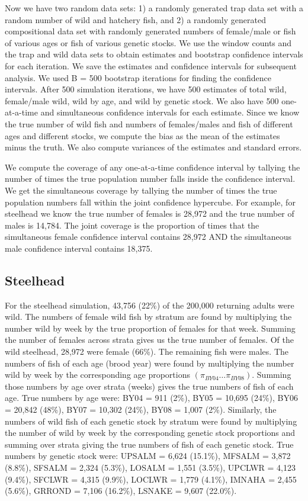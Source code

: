 \documentclass[12pt]{article}
\begin{document}
Now we have two random data sets: 1) a randomly generated trap data set with a random number of wild and hatchery fish, and 2) a randomly generated compositional data set with randomly generated numbers of female/male or fish of various ages or fish of various genetic stocks. We use the window counts and the trap and wild data sets to obtain estimates and bootstrap confidence intervals for each iteration. We save the estimates and confidence intervals for subsequent analysis. We used B = 500 bootstrap iterations for finding the confidence intervals. After 500 simulation iterations, we have 500 estimates of total wild, female/male wild, wild by age, and wild by genetic stock. We also have 500 one-at-a-time and simultaneous confidence intervals for each estimate. Since we know the true number of wild fish and numbers of females/males and fish of different ages and different stocks, we compute the bias as the mean of the estimates minus the truth. We also compute variances of the estimates and standard errors.

We compute the coverage of any one-at-a-time confidence interval by tallying the number of times the true population number falls inside the confidence interval. We get the simultaneous coverage by tallying the number of times the true population numbers fall within the joint confidence hypercube. For example, for steelhead we know the true number of females is 28,972 and the true number of males is 14,784. The joint coverage is the proportion of times that the simultaneous female confidence interval contains 28,972 AND the simultaneous male confidence interval contains 18,375.

\subsection{Steelhead}

For the steelhead simulation, 43,756 (22\%) of the 200,000 returning adults were wild. The numbers of female wild fish by stratum are found by multiplying the number wild by week by the true proportion of females for that week. Summing the number of females across strata gives us the true number of females. Of the wild steelhead, 28,972 were female (66\%). The remaining fish were males. The numbers of fish of each age (brood year) were found by multiplying the number wild by week by the corresponding age proportions $(\pi_{BY04}\ldots \pi_{BY08})$. Summing those numbers by age over strata (weeks) gives the true numbers of fish of each age. True numbers by age were: BY04 = 911 (2\%), BY05 = 10,695 (24\%), BY06 = 20,842 (48\%), BY07 = 10,302 (24\%), BY08 = 1,007 (2\%). Similarly, the numbers of wild fish of each genetic stock by stratum were found by multiplying the number of wild by week by the corresponding genetic stock proportions and summing over strata giving the true numbers of fish of each genetic stock. True numbers by genetic stock were: UPSALM = 6,624 (15.1\%), MFSALM = 3,872 (8.8\%), SFSALM = 2,324 (5.3\%), LOSALM = 1,551 (3.5\%), UPCLWR = 4,123 (9.4\%), SFCLWR = 4,315 (9.9\%), LOCLWR = 1,779 (4.1\%), IMNAHA = 2,455 (5.6\%), GRROND = 7,106 (16.2\%), LSNAKE = 9,607 (22.0\%).
\end{document}
